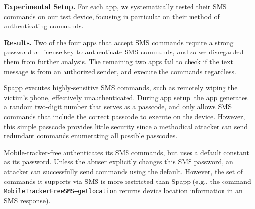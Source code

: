\textbf{Experimental Setup.}
For each app, we systematically tested their SMS commands on our test
device, focusing in particular on their method of authenticating commands. 

\textbf{Results.}  Two of the four apps that accept SMS commands
require a strong password or license key to authenticate SMS commands,
and so we disregarded them from further analysis.
The remaining two apps fail to check if the text message is from an
authorized sender, and execute the commands regardless.




Spapp executes highly-sensitive SMS commands, such as remotely wiping
the victim's phone, effectively unauthenticated.  During app setup,
the app generates a random two-digit number that serves as a passcode,
and only allows SMS commands that include the correct passcode to
execute on the device.  However, this simple passcode provides little
security since a methodical attacker can send redundant commands
enumerating all possible passcodes.

Mobile-tracker-free authenticates its SMS commands, but uses a default
constant as its password.  Unless the abuser explicitly changes this
SMS password, an attacker can successfully send commands using the
default.  However, the set of commands it supports via SMS is more
restricted than Spapp (e.g., the
command \texttt{MobileTrackerFreeSMS--getlocation}
returns device location information in an SMS response).

